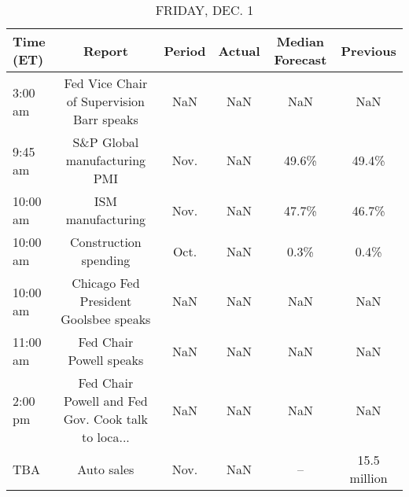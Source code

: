 \documentclass{article}%
\begin{document}
\begin{table}[htbp]%
\caption{FRIDAY, DEC. 1}%
\centering%
\begin{adjustbox}{width=1\textwidth}%
\begin{tabular}{lccccc}
\toprule
Time (ET) &                                             Report & Period & Actual & Median Forecast &     Previous \\
\midrule
  3:00 am &          Fed Vice Chair of Supervision Barr speaks &    NaN &    NaN &             NaN &          NaN \\
  9:45 am &                       S\&P Global manufacturing PMI &   Nov. &    NaN &           49.6\% &        49.4\% \\
 10:00 am &                                  ISM manufacturing &   Nov. &    NaN &           47.7\% &        46.7\% \\
 10:00 am &                              Construction spending &   Oct. &    NaN &            0.3\% &         0.4\% \\
 10:00 am &              Chicago Fed President Goolsbee speaks &    NaN &    NaN &             NaN &          NaN \\
 11:00 am &                            Fed Chair Powell speaks &    NaN &    NaN &             NaN &          NaN \\
  2:00 pm & Fed Chair Powell and Fed Gov. Cook talk to loca... &    NaN &    NaN &             NaN &          NaN \\
      TBA &                                         Auto sales &   Nov. &    NaN &              -- & 15.5 million \\
\bottomrule
\end{tabular}
%
\end{adjustbox}%
\end{table}
\end{document}
